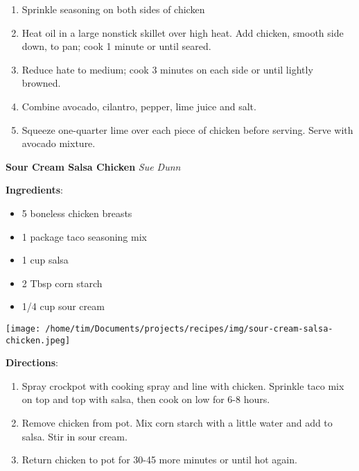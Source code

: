 \documentclass[11pt, twoside, openany]{book}
\begin{document}
\begin{minipage}[t]{\linewidth}
\begin{enumerate}
\item Sprinkle seasoning on both sides of chicken
\item Heat oil in a large nonstick skillet over high heat. Add chicken, smooth side down, to pan; cook 1 minute or until seared.
\item Reduce hate to medium; cook 3 minutes on each side or until lightly browned.
\item Combine avocado, cilantro, pepper, lime juice and salt.
\item Squeeze one-quarter lime over each piece of chicken before serving. Serve with avocado mixture.
\end{enumerate}
\end{minipage}\vspace{8mm}
\noindent\begin{minipage}[t]{\linewidth}%
{\Large\textbf{Sour Cream Salsa Chicken}} \label{sour-cream-salsa-chicken}\hfill\textit{Sue Dunn}\\
\noindent\begin{minipage}[t]{0.78\linewidth}%
\textbf{Ingredients}:\vspace{-3mm}
\begin{multicols}{2}
\begin{itemize}\setlength\itemsep{-1mm}
\item 5 boneless chicken breasts
\item 1 package taco seasoning mix
\item 1 cup salsa
\item 2 Tbsp corn starch
\item 1/4 cup sour cream
\end{itemize}
\end{multicols}
\end{minipage}
\noindent\begin{minipage}[t]{0.18\linewidth}
\centering \strut\vspace*{-\baselineskip}\newline
\texttt{[image: /home/tim/Documents/projects/recipes/img/sour-cream-salsa-chicken.jpeg]}\\
\end{minipage}\vspace{3mm}
\textbf{Directions}:
\vspace{-3mm}\begin{enumerate}\setlength\itemsep{-1mm}
\item Spray crockpot with cooking spray and line with chicken. Sprinkle taco mix on top and top with salsa, then cook on low for 6-8 hours.
\item Remove chicken from pot. Mix corn starch with a little water and add to salsa. Stir in sour cream.
\item Return chicken to pot for 30-45 more minutes or until hot again.
\end{enumerate}
\end{minipage}\vspace{8mm}
\end{document}
